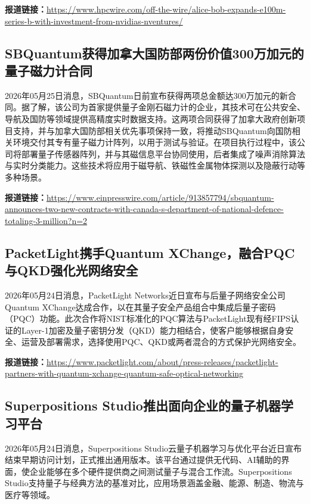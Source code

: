 \documentclass[12pt,a4paper]{ctexart}
\begin{document}
\noindent\textbf{报道链接：}\url{https://www.hpcwire.com/off-the-wire/alice-bob-expands-e100m-series-b-with-investment-from-nvidias-nventures/}

\subsection{ SBQuantum获得加拿大国防部两份价值300万加元的量子磁力计合同 }

2026年05月25日消息，SBQuantum日前宣布获得两项总金额达300万加元的新合同。据了解，该公司为首家提供量子金刚石磁力计的企业，其技术可在公共安全、导航及国防等领域提供高精度实时数据支持。这两项合同获得了加拿大政府创新项目支持，并与加拿大国防部相关优先事项保持一致，将推动SBQuantum向国防相关环境交付其专有量子磁力计阵列，以用于测试与验证。在项目执行过程中，该公司将部署量子传感器阵列，并与其磁信息平台协同使用，后者集成了噪声消除算法与实时分类能力。这些技术将应用于磁导航、铁磁性金属物体探测以及隐蔽行动等多种场景。

\noindent\textbf{报道链接：}\url{https://www.einpresswire.com/article/913857794/sbquantum-announces-two-new-contracts-with-canada-s-department-of-national-defence-totaling-3-million?n=2}

\subsection{ PacketLight携手Quantum XChange，融合PQC与QKD强化光网络安全 }

2026年05月24日消息，PacketLight Networks近日宣布与后量子网络安全公司Quantum XChange达成合作，以在其量子安全产品组合中集成后量子密码（PQC）功能。此次合作将NIST标准化的PQC算法与PacketLight现有经FIPS认证的Layer-1加密及量子密钥分发（QKD）能力相结合，使客户能够根据自身安全、运营及部署需求，选择使用PQC、QKD或两者混合的方式保护光网络安全。

\noindent\textbf{报道链接：}\url{https://www.packetlight.com/about/press-releases/packetlight-partners-with-quantum-xchange-quantum-safe-optical-networking}

\subsection{ Superpositions Studio推出面向企业的量子机器学习平台 }

2026年05月24日消息，Superpositions Studio云量子机器学习与优化平台近日宣布结束早期访问计划，正式推出通用版本。该平台通过提供无代码、AI辅助的界面，使企业能够在多个硬件提供商之间测试量子与混合工作流。Superpositions Studio支持量子与经典方法的基准对比，应用场景涵盖金融、能源、制造、物流与医疗等领域。
\end{document}
